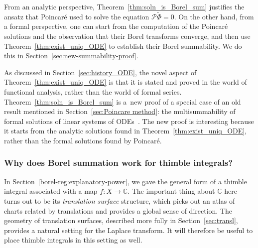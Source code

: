 \documentclass[10pt,a4paper]{amsart}
\newcommand{\maps}{\colon}
\newcommand{\C}{\mathbb{C}}
\newcommand{\series}[1]{\tilde{#1}}
\numberwithin{equation}{section}
\begin{document}
From an analytic perspective, Theorem~\ref{thm:soln_is_Borel_sum} justifies the ansatz that Poincar\'e used to solve the equation $\mathcal{P}\series{\Phi} = 0$. On the other hand, from a formal perspective, one can start from the computation of the Poincar\'e solutions and the observation that their Borel transforms converge, and then use Theorem~\ref{thm:exist_uniq_ODE} to establish their Borel summability. We do this in Section~\ref{sec:new-summability-proof}.

As discussed in Section~\ref{sec:history_ODE}, the novel aspect of Theorem~\ref{thm:exist_uniq_ODE} is that it is stated and proved in the world of functional analysis, rather than the world of formal series. Theorem~\ref{thm:soln_is_Borel_sum} is a~new proof of a special case of an old result mentioned in Section~\ref{sec:Poincare method}: the multisummability of formal solutions of linear systems of ODEs~\cite{braaksma2006laplace,ramis1991series}. The new proof is interesting because it starts from the analytic solutions found in Theorem~\ref{thm:exist_uniq_ODE}, rather than the formal solutions found by Poincar\'e.

\subsubsection{Why does Borel summation work for thimble integrals?}\label{sec:why_borel_thimble}
In Section~\ref{borel-reg:explanatory-power}, we gave the general form of a thimble integral associated with a map $f \maps X \to \C$. The important thing about $\C$ here turns out to be its {\em translation surface} structure, which picks out an atlas of charts related by translations and provides a global sense of direction. The geometry of translation surfaces, described more fully in Section~\ref{sec:transl}, provides a natural setting for the Laplace transform. It will therefore be useful to place thimble integrals in this setting as well.
\end{document}
